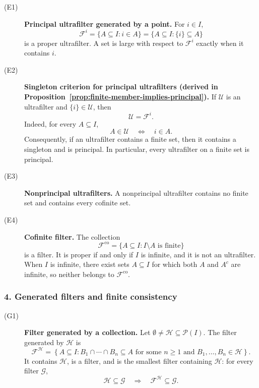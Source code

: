 {\begin{description}
    \item[\textnormal{(E1)}] \textbf{Principal ultrafilter generated by a point.}
    For \(i\in I\),
    \[
    \mathcal{F}^{i}
    =
    \{A\subseteq I:i\in A\}
    =
    \{A\subseteq I:\{i\}\subseteq A\}
    \]
    is a proper ultrafilter. A set is large with respect to
    \(\mathcal{F}^{i}\) exactly when it contains \(i\).

    \item[\textnormal{(E2)}]
\textbf{Singleton criterion for principal ultrafilters
(derived in Proposition~\ref{prop:finite-member-implies-principal}).}
If \(\mathcal{U}\) is an ultrafilter and \(\{i\}\in\mathcal{U}\), then
\[
\mathcal{U}=\mathcal{F}^{i}.
\]
Indeed, for every \(A\subseteq I\),
\[
A\in\mathcal{U}
\quad\Longleftrightarrow\quad
i\in A.
\]
Consequently, if an ultrafilter contains a finite set, then it contains a
singleton and is principal. In particular, every ultrafilter on a finite
    set is principal.

    \item[\textnormal{(E3)}] \textbf{Nonprincipal ultrafilters.}
    A nonprincipal ultrafilter contains no finite set and contains every
    cofinite set.

    \item[\textnormal{(E4)}] \textbf{Cofinite filter.}
    The collection
    \[
    \mathcal{F}^{\mathrm{co}}
    =
    \{A\subseteq I:I\setminus A\text{ is finite}\}
    \]
    is a filter. It is proper if and only if \(I\) is infinite, and it is
    not an ultrafilter. When \(I\) is infinite, there exist sets
    \(A\subseteq I\) for which both \(A\) and \(A^c\) are infinite, so
    neither belongs to \(\mathcal{F}^{\mathrm{co}}\).
\end{description}

\subsubsection*{4. Generated filters and finite consistency}

\begin{description}
    \item[\textnormal{(G1)}] \textbf{Filter generated by a collection.}
    Let \(\emptyset\neq\mathcal{H}\subseteq\mathcal{P}(I)\). The filter
    generated by \(\mathcal{H}\) is
    \[
    \mathcal{F}^{\mathcal{H}}
    =
    \left\{
    A\subseteq I:
    B_1\cap\cdots\cap B_n\subseteq A
    \text{ for some }n\geq 1
    \text{ and }B_1,\ldots,B_n\in\mathcal{H}
    \right\}.
    \]
    It contains \(\mathcal{H}\), is a filter, and is the smallest filter
    containing \(\mathcal{H}\): for every filter \(\mathcal{G}\),
    \[
    \mathcal{H}\subseteq\mathcal{G}
    \quad\Longrightarrow\quad
    \mathcal{F}^{\mathcal{H}}\subseteq\mathcal{G}.
    \]


\end{description}}
